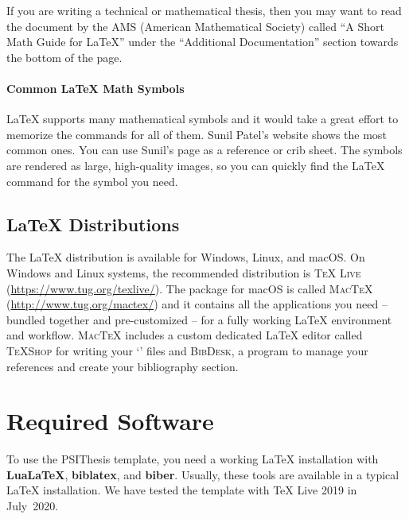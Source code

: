 If you are writing a technical or mathematical thesis, then you may want to read the document by the AMS (American Mathematical Society) called \enquote{A Short Math Guide for LaTeX}
under the \enquote{Additional Documentation} section towards the bottom of the page.

\paragraph{Common LaTeX Math Symbols}
LaTeX supports many mathematical symbols and it would take a great effort to memorize the commands for all of them. Sunil Patel's website shows the most common ones.
You can use Sunil's page as a reference or crib sheet. The symbols are rendered as large, high-quality images, so you can quickly find the LaTeX command for the symbol you need.

\subsection{LaTeX Distributions}

The LaTeX distribution is available for Windows, Linux, and macOS\@.
On Windows and Linux systems, the recommended distribution is \textsc{TeX Live} (\url{https://www.tug.org/texlive/}).
The package for macOS is called \textsc{MacTeX} (\url{http://www.tug.org/mactex/}) and it contains all the applications you need -- bundled together and pre-customized -- for a fully working LaTeX environment and workflow.
\textsc{MacTeX} includes a custom dedicated LaTeX editor called \textsc{TeXShop} for writing your `' files and \textsc{BibDesk}, a program to manage your references and create your bibliography section.



\section{Required Software}
\label{sec:requirements}

To use the PSIThesis template, you need a working LaTeX installation with \textbf{LuaLaTeX}, \textbf{biblatex}, and \textbf{biber}.%
Usually, these tools are available in a typical LaTeX installation. We have tested the template with TeX Live 2019 in July~2020.

